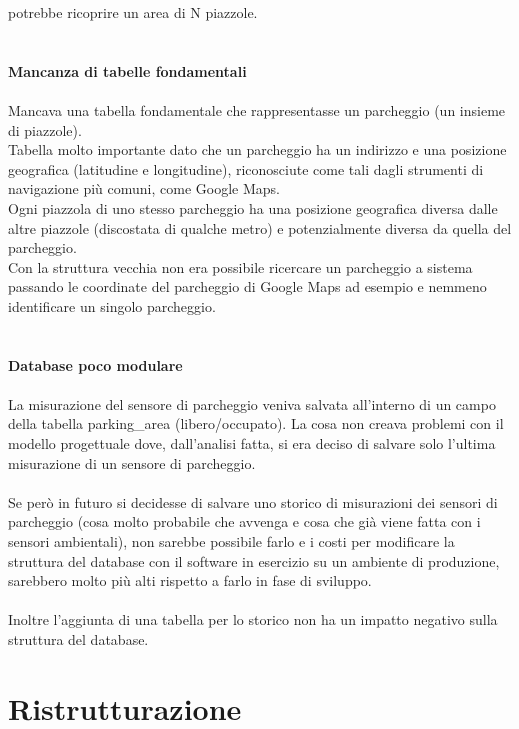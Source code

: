 potrebbe ricoprire un area di N piazzole.
\\\\\\
\textbf{Mancanza di tabelle fondamentali}
\\\\
Mancava una tabella fondamentale che rappresentasse un parcheggio (un insieme di piazzole). 
\\
Tabella molto importante dato che un parcheggio ha un indirizzo e una posizione geografica (latitudine e longitudine), 
riconosciute come tali dagli strumenti di navigazione più comuni, come Google Maps. 
\\
Ogni piazzola di uno stesso parcheggio ha una posizione geografica diversa dalle altre piazzole (discostata di qualche 
metro) e potenzialmente diversa da quella del parcheggio. 
\\
Con la struttura vecchia non era possibile ricercare un parcheggio a sistema passando le coordinate del parcheggio di Google
Maps ad esempio e nemmeno identificare un singolo parcheggio.
\\\\\\
\textbf{Database poco modulare}
\\\\
La misurazione del sensore di parcheggio veniva salvata all'interno di un campo della tabella parking\_area (libero/occupato). La cosa non creava problemi con il modello progettuale dove,
dall'analisi fatta, si era deciso di salvare solo l'ultima misurazione di un sensore di parcheggio.
\\\\
Se però in futuro si decidesse di salvare uno storico di misurazioni dei sensori di parcheggio (cosa molto probabile che
avvenga e cosa che già viene fatta con i sensori ambientali), non sarebbe possibile farlo e i costi
per modificare la struttura del database con il software in esercizio su un ambiente di produzione, sarebbero molto più
alti rispetto a farlo in fase di sviluppo.
\\\\
Inoltre l'aggiunta di una tabella per lo storico non ha un impatto negativo sulla struttura del database.
\section{Ristrutturazione}

